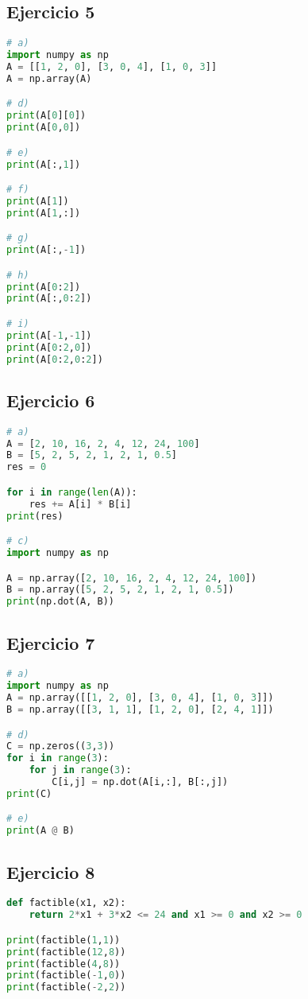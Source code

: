 \documentclass[12pt]{article}
\begin{document}
\subsection{Ejercicio 5}
\begin{lstlisting}[language=Python]
# a)
import numpy as np
A = [[1, 2, 0], [3, 0, 4], [1, 0, 3]]
A = np.array(A)

# d)
print(A[0][0])
print(A[0,0])

# e)
print(A[:,1])

# f)
print(A[1])
print(A[1,:])

# g)
print(A[:,-1])

# h)
print(A[0:2])
print(A[:,0:2])

# i)
print(A[-1,-1])
print(A[0:2,0])
print(A[0:2,0:2])
\end{lstlisting}

\subsection{Ejercicio 6}
\begin{lstlisting}[language=Python]
# a)
A = [2, 10, 16, 2, 4, 12, 24, 100]
B = [5, 2, 5, 2, 1, 2, 1, 0.5]
res = 0

for i in range(len(A)):
    res += A[i] * B[i]
print(res)

# c)
import numpy as np

A = np.array([2, 10, 16, 2, 4, 12, 24, 100])
B = np.array([5, 2, 5, 2, 1, 2, 1, 0.5])
print(np.dot(A, B))
\end{lstlisting}

\subsection{Ejercicio 7}
\begin{lstlisting}[language=Python]
# a)
import numpy as np
A = np.array([[1, 2, 0], [3, 0, 4], [1, 0, 3]])
B = np.array([[3, 1, 1], [1, 2, 0], [2, 4, 1]])

# d)
C = np.zeros((3,3))
for i in range(3):
    for j in range(3):
        C[i,j] = np.dot(A[i,:], B[:,j])
print(C)

# e)
print(A @ B)
\end{lstlisting}

\subsection{Ejercicio 8}
\begin{lstlisting}[language=Python]
def factible(x1, x2):
    return 2*x1 + 3*x2 <= 24 and x1 >= 0 and x2 >= 0

print(factible(1,1))
print(factible(12,8))
print(factible(4,8))
print(factible(-1,0))
print(factible(-2,2))
\end{lstlisting}
\end{document}

